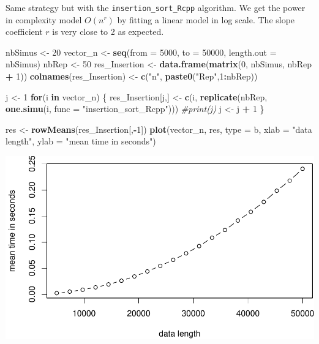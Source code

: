 \documentclass[
]{article}
\newenvironment{Shaded}{\begin{snugshade}}{\end{snugshade}}
\newcommand{\AttributeTok}[1]{\textcolor[rgb]{0.13,0.29,0.53}{#1}}
\newcommand{\CommentTok}[1]{\textcolor[rgb]{0.56,0.35,0.01}{\textit{#1}}}
\newcommand{\ControlFlowTok}[1]{\textcolor[rgb]{0.13,0.29,0.53}{\textbf{#1}}}
\newcommand{\DecValTok}[1]{\textcolor[rgb]{0.00,0.00,0.81}{#1}}
\newcommand{\FunctionTok}[1]{\textcolor[rgb]{0.13,0.29,0.53}{\textbf{#1}}}
\newcommand{\NormalTok}[1]{#1}
\newcommand{\OtherTok}[1]{\textcolor[rgb]{0.56,0.35,0.01}{#1}}
\newcommand{\SpecialCharTok}[1]{\textcolor[rgb]{0.81,0.36,0.00}{\textbf{#1}}}
\newcommand{\StringTok}[1]{\textcolor[rgb]{0.31,0.60,0.02}{#1}}
\begin{document}
Same strategy but with the \texttt{insertion\_sort\_Rcpp} algorithm. We
get the power in complexity model \(O(n^r)\) by fitting a linear model
in log scale. The slope coefficient \(r\) is very close to 2 as
expected.

\begin{Shaded}
\begin{Highlighting}[]
\NormalTok{nbSimus }\OtherTok{\textless{}{-}} \DecValTok{20}
\NormalTok{vector\_n }\OtherTok{\textless{}{-}} \FunctionTok{seq}\NormalTok{(}\AttributeTok{from =} \DecValTok{5000}\NormalTok{, }\AttributeTok{to =} \DecValTok{50000}\NormalTok{, }\AttributeTok{length.out =}\NormalTok{ nbSimus)}
\NormalTok{nbRep }\OtherTok{\textless{}{-}} \DecValTok{50}
\NormalTok{res\_Insertion }\OtherTok{\textless{}{-}} \FunctionTok{data.frame}\NormalTok{(}\FunctionTok{matrix}\NormalTok{(}\DecValTok{0}\NormalTok{, nbSimus, nbRep }\SpecialCharTok{+} \DecValTok{1}\NormalTok{))}
\FunctionTok{colnames}\NormalTok{(res\_Insertion) }\OtherTok{\textless{}{-}} \FunctionTok{c}\NormalTok{(}\StringTok{"n"}\NormalTok{, }\FunctionTok{paste0}\NormalTok{(}\StringTok{"Rep"}\NormalTok{,}\DecValTok{1}\SpecialCharTok{:}\NormalTok{nbRep))}

\NormalTok{j }\OtherTok{\textless{}{-}} \DecValTok{1}
\ControlFlowTok{for}\NormalTok{(i }\ControlFlowTok{in}\NormalTok{ vector\_n)}
\NormalTok{\{}
\NormalTok{  res\_Insertion[j,] }\OtherTok{\textless{}{-}} \FunctionTok{c}\NormalTok{(i, }\FunctionTok{replicate}\NormalTok{(nbRep, }\FunctionTok{one.simu}\NormalTok{(i, }\AttributeTok{func =} \StringTok{"insertion\_sort\_Rcpp"}\NormalTok{)))  }
  \CommentTok{\#print(j)}
\NormalTok{  j }\OtherTok{\textless{}{-}}\NormalTok{ j }\SpecialCharTok{+} \DecValTok{1}
\NormalTok{\}}

\NormalTok{res }\OtherTok{\textless{}{-}} \FunctionTok{rowMeans}\NormalTok{(res\_Insertion[,}\SpecialCharTok{{-}}\DecValTok{1}\NormalTok{])}
\FunctionTok{plot}\NormalTok{(vector\_n, res, }\AttributeTok{type =} \StringTok{\textquotesingle{}b\textquotesingle{}}\NormalTok{, }\AttributeTok{xlab =} \StringTok{"data length"}\NormalTok{, }\AttributeTok{ylab =} \StringTok{"mean time in seconds"}\NormalTok{)}
\end{Highlighting}
\end{Shaded}

\includegraphics{1_Sorting_analyse_files/figure-latex/unnamed-chunk-14-1.pdf}
\end{document}
